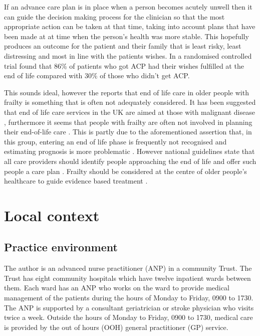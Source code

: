 \documentclass
[
	12pt,
	a4paper,
	oneside,
]{report}
\begin{document}
If an advance care plan is in place when a person becomes acutely unwell then it
can guide the decision making process for the clinician so that the most appropriate
action can be taken at that time, taking into account plans that have been made 
at at time when the person's health was more stable. This hopefully produces an
outcome for the patient and their family that is least risky, least distressing
and most in line with the patients wishes. In a randomised controlled trial
\textcite{detering:10} found that 86\% of patients who got ACP had their wishes
fulfilled at the end of life compared with 30\% of those who didn't get ACP.

This sounds ideal, however the \textcite{silver:12} reports that end of life care 
in older people with frailty
is something that is often not adequately considered. It has been suggested that 
end of life care services in the UK are aimed at those with malignant 
disease \parencite{sharp:13}, furthermore it seems that people with frailty 
are often not involved in planning their 
end-of-life care \textcite{oliver:14}. This is partly due to the aforementioned 
assertion 
that, in this group, entering an end of life phase is frequently not recognised 
\textcite{wallington:16} and
estimating prognosis is more problematic \parencite{silver:12}. However national
guidelines state that all care providers should identify people approaching 
the end of life and offer such people a care plan \parencite{dh:09}.
Frailty should be considered at the centre of older people's healthcare to guide
evidence based treatment \parencite{woo:14}.

\section{Local context}

\subsection{Practice environment}
\label{sec:local-practice}
The author is an advanced nurse practitioner (ANP) in a community Trust.
The Trust has eight community hospitals which have twelve inpatient wards between
them. Each ward has
an ANP who works on the ward to provide medical management of the patients during 
the hours of Monday to Friday, 0900 to 1730. The ANP is supported by a consultant
geriatrician or stroke physician who visits twice a week. Outside the hours of 
Monday to Friday, 0900 to 1730, medical care 
is provided by the out of hours (OOH) general practitioner (GP) service. 
\end{document}

